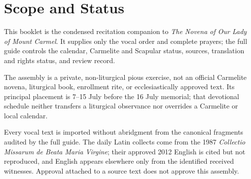\section{Scope and Status}

This booklet is the condensed recitation companion to \textit{The Novena of Our Lady of Mount Carmel}. It supplies only the vocal order and complete prayers; the full guide controls the calendar, Carmelite and Scapular status, sources, translation and rights status, and review record.

The assembly is a private, non-liturgical pious exercise, not an official Carmelite novena, liturgical book, enrollment rite, or ecclesiastically approved text. Its principal placement is 7--15 July before the 16 July memorial; that devotional schedule neither transfers a liturgical observance nor overrides a Carmelite or local calendar.

Every vocal text is imported without abridgment from the canonical fragments audited by the full guide. The daily Latin collects come from the 1987 \textit{Collectio Missarum de Beata Maria Virgine}; their approved 2012 English is cited but not reproduced, and English appears elsewhere only from the identified received witnesses. Approval attached to a source text does not approve this assembly.

